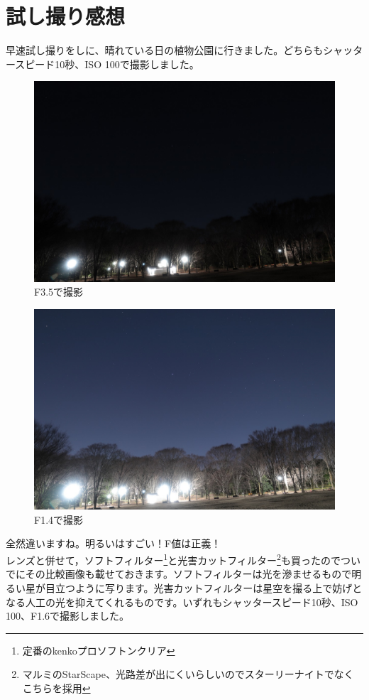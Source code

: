 \documentclass[supernova_2023]{subfiles}
\begin{document}
\section{試し撮り感想}
早速試し撮りをしに、晴れている日の植物公園に行きました。どちらもシャッタースピード10秒、ISO 100で撮影しました。
\begin{figure}[H]
\begin{center}
  \includegraphics[width=12cm]{figures/Maruyama/kurai.jpg}
\caption{F3.5で撮影}
\end{center}
\end{figure}
\begin{figure}[H]
\begin{center}
  \includegraphics[width=12cm]{figures/Maruyama/akarui.jpg}
\caption{F1.4で撮影}
\end{center}
\end{figure}
全然違いますね。明るいはすごい！F値は正義！\\
レンズと併せて，ソフトフィルター\footnote{定番のkenkoプロソフトンクリア}と光害カットフィルター\footnote{マルミのStarScape、光路差が出にくいらしいのでスターリーナイトでなくこちらを採用}も買ったのでついでにその比較画像も載せておきます。ソフトフィルターは光を滲ませるもので明るい星が目立つように写ります。光害カットフィルターは星空を撮る上で妨げとなる人工の光を抑えてくれるものです。いずれもシャッタースピード10秒、ISO 100、F1.6で撮影しました。
\end{document}
